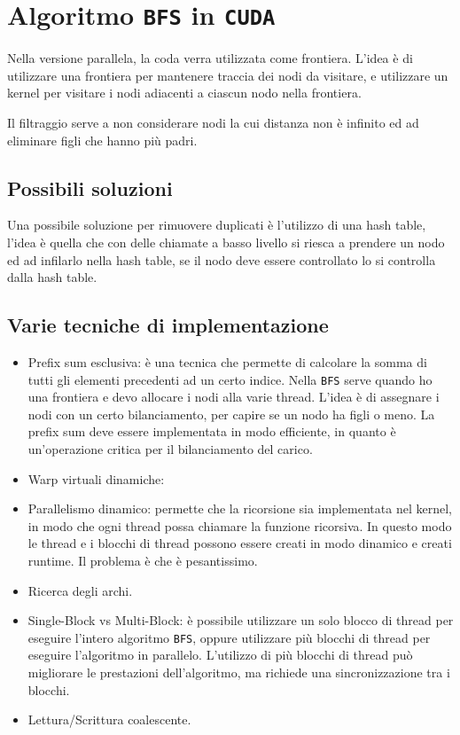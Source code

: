 \section{Algoritmo \texttt{BFS} in \texttt{CUDA}}
Nella versione parallela, la coda verra utilizzata come 
frontiera.
L'idea è di utilizzare una frontiera per mantenere traccia
dei nodi da visitare, e utilizzare un kernel per visitare
i nodi adiacenti a ciascun nodo nella frontiera.

Il filtraggio serve a non considerare nodi la cui distanza non è infinito 
ed ad eliminare figli che hanno più padri.

\subsection{Possibili soluzioni}
Una possibile soluzione per rimuovere duplicati è l'utilizzo di una 
hash table, l'idea è quella che con delle chiamate a basso livello si 
riesca a prendere un nodo ed ad infilarlo nella hash table, se il nodo
deve essere controllato lo si controlla dalla hash table.

\subsection{Varie tecniche di implementazione}
\begin{itemize}
  \item Prefix sum esclusiva: è una tecnica che permette di calcolare
  la somma di tutti gli elementi precedenti ad un certo indice.
  Nella \texttt{BFS} serve quando ho una frontiera e devo allocare i nodi 
  alla varie thread. L'idea è di assegnare i nodi con un certo bilanciamento, 
  per capire se un nodo ha figli o meno.
  La prefix sum deve essere implementata in modo efficiente, in quanto
  è un'operazione critica per il bilanciamento del carico.
  \item Warp virtuali dinamiche:
  \item Parallelismo dinamico: permette che la ricorsione sia 
  implementata nel kernel, in modo che ogni thread possa chiamare
  la funzione ricorsiva. In questo modo le thread e i blocchi di 
  thread possono essere creati in modo dinamico e creati runtime.
  Il problema è che è pesantissimo.
  \item Ricerca degli archi.
  \item Single-Block vs Multi-Block: è possibile utilizzare un solo
  blocco di thread per eseguire l'intero algoritmo \texttt{BFS}, oppure
  utilizzare più blocchi di thread per eseguire l'algoritmo in parallelo.
  L'utilizzo di più blocchi di thread può migliorare le prestazioni
  dell'algoritmo, ma richiede una sincronizzazione tra i blocchi.
  \item Lettura/Scrittura coalescente.
\end{itemize}

